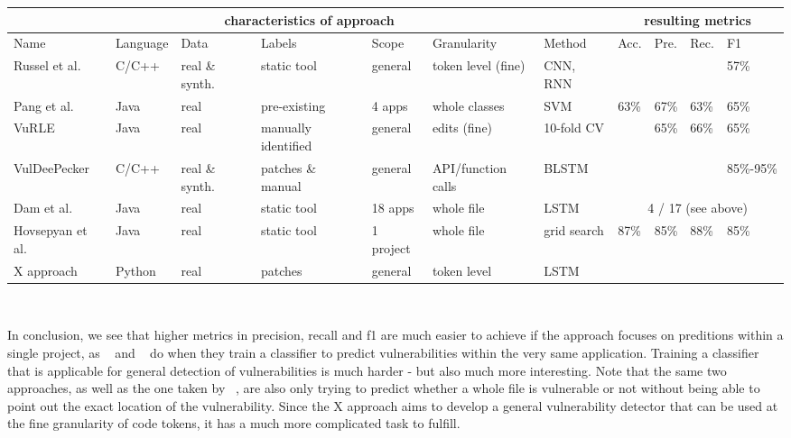 \documentclass[
	a4paper,
	pagesize,
	pdftex,
	12pt,
	twoside, %
	BCOR=5mm, %
	ngerman,
	fleqn,
	final,
	]{scrartcl}
\begin{document}
\scriptsize
\begin{tabular}{ | p{1.4cm} | p{1cm}|  p{0.8cm}| p{1.5cm} |  p{1.2cm} | p{1.5cm} | p{1.2cm} || p{0.4cm}|p{0.4cm}|p{0.4cm}|p{0.4cm}|  }
	\hline
	\multicolumn{7}{|c||}{characteristics of approach} & \multicolumn{4}{c|}{resulting metrics} \\
	\hline
	Name &  Language & Data & Labels & Scope &Granularity & Method & Acc. & Pre. & Rec. & F1  \\
	\hline
	Russel et al. & C/C++ & real \& synth. & static tool & general & token level (fine) & CNN, RNN &  &   &   &  57\%  \\
	\hline
	Pang et al. & Java & real  & pre-existing  & 4 apps & whole classes & SVM & 63\% & 67\%  & 63\%  & 65\%    \\
	\hline
	VuRLE & Java & real  & manually identified  & general & edits (fine) & 10-fold CV &  & 65\%  & 66\%  & 65\%    \\
	\hline
	VulDeePecker & C/C++ & real \& synth.  & patches \& manual & general & API/function calls & BLSTM &  &   &  & 85\%-95\%    \\
	\hline
	Dam et al. & Java & real &static tool & 18 apps & whole file & LSTM & \multicolumn{4}{c|}{ 4 / 17 (see above)}   \\
	\hline
	Hovsepyan et al. & Java & real  &static tool  & 1 project & whole file & grid search & 87\% & 	85\%  & 88\%  & 85\%   \\
	\hline
	X approach & Python & real  &patches& general  & token level & LSTM &  & &  &    \\
	\hline
	\hline 
\end{tabular}\\
\normalsize

In conclusion, we see that higher metrics in precision, recall and f1 are much easier to achieve if the approach focuses on preditions within a single project, as ~\cite{Hovsepyan.2012} and ~\cite{Dam.2017} do when they train a classifier to predict vulnerabilities within the very same application. Training a classifier that is applicable for general detection of vulnerabilities is much harder - but also much more interesting. Note that the same two approaches, as well as the one taken by  ~\cite{Pang.2015}, are also only trying to predict whether a whole file is vulnerable or not without being able to point out the exact location of the vulnerability. Since the X approach aims to develop a general vulnerability detector that can be used at the fine granularity of code tokens, it has a much more complicated task to fulfill.
\end{document}
